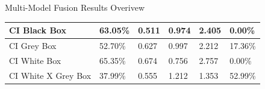 \documentclass{beamer}
\begin{document}
\begin{frame}[t]{Multi-Model Fusion Results Overivew}
\begin{table}[htp!]
\begin{tabular}{|p{2.5cm}|p{1.3cm}|p{1.0cm}|p{1.7cm}|p{1.0cm}|p{1.5cm}|}
      CI Black Box &
      63.05\% &
      0.511 &
      0.974 &
      2.405 &
      0.00\% \\
      \hline

      CI Grey Box &
      52.70\% &
      0.627 &
      0.997 &
      2.212 &
      17.36\% \\
      \hline

      CI White Box &
      65.35\% &
      0.674 &
      0.756 &
      2.757 &
      0.00\% \\
      \hline

      CI White X Grey Box &
      37.99\% &
      0.555 &
      1.212 &
      1.353 &
      52.99\% \\
      \hline



\end{tabular}
\end{table}

\end{frame}
\end{document}
